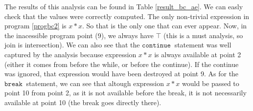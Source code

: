 \documentclass[a4wide,12pt]{article}
\def\cont {\texttt{continue}\ }
\def\breakc{\texttt{break}\ }
\begin{document}
The results of this analysis can be found in Table \ref{result_bc_ae}.
We can easly check that the values were correctly computed. The only non-trivial
expression in program \ref{progbc2} is $x*x$. So that is the only one that can ever appear.
Now, in the inacessible program point (9), we always have $\top$ (this is a must analysis, so
join is intersection). We can also see that the $\cont$ statement was well captured by the analysis
because expression $x*x$ is always
available at point 2 (either it comes from before the while, or before the continue). If the continue was ignored, that expression would have been destroyed at point 9. As for the $\breakc$ statement, we can see that altough expression $x*x$ would be passed to point 10 from point 2, 
as it is not available before the break, it is not necessarily available at point 10 (the break
goes directly there).
\end{document}
